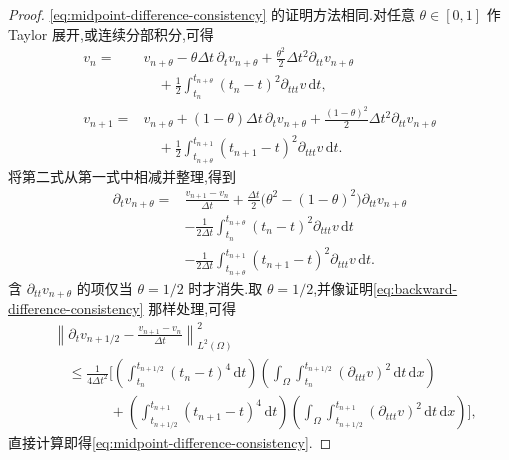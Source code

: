 \begin{proof}
\cref{eq:midpoint-difference-consistency} 的证明方法相同.对任意 $\theta\in[0,1]$ 作 Taylor 展开,或连续分部积分,可得
\[
\begin{aligned}
 v_n={}&v_{n+\theta}-\theta\Delta t\,\partial_t v_{n+\theta}
       +\frac{\theta^2}{2}\Delta t^2\partial_{tt}v_{n+\theta}\\
      &\quad+\frac12\int_{t_n}^{t_{n+\theta}}
          (t_n-t)^2\partial_{ttt}v\,\mathrm{d}t,\\
 v_{n+1}={}&v_{n+\theta}+(1-\theta)\Delta t\,\partial_t v_{n+\theta}
       +\frac{(1-\theta)^2}{2}\Delta t^2\partial_{tt}v_{n+\theta}\\
      &\quad+\frac12\int_{t_{n+\theta}}^{t_{n+1}}
          (t_{n+1}-t)^2\partial_{ttt}v\,\mathrm{d}t.
\end{aligned}
\]
将第二式从第一式中相减并整理,得到
\[
\begin{aligned}
 \partial_t v_{n+\theta}
   ={}&\frac{v_{n+1}-v_n}{\Delta t}
      +\frac{\Delta t}{2}\bigl(\theta^2-(1-\theta)^2\bigr)
          \partial_{tt}v_{n+\theta}\\
     &-\frac1{2\Delta t}\int_{t_n}^{t_{n+\theta}}
          (t_n-t)^2\partial_{ttt}v\,\mathrm{d}t
      \\[-1mm]
     &-\frac1{2\Delta t}\int_{t_{n+\theta}}^{t_{n+1}}
          (t_{n+1}-t)^2\partial_{ttt}v\,\mathrm{d}t.
\end{aligned}
\]
含 $\partial_{tt}v_{n+\theta}$ 的项仅当 $\theta=1/2$ 时才消失.取 $\theta=1/2$,并像证明\cref{eq:backward-difference-consistency} 那样处理,可得
\[
\begin{aligned}
 &\left\|\partial_t v_{n+1/2}
       -\frac{v_{n+1}-v_n}{\Delta t}\right\|_{L^2(\Omega)}^2\\
 &\quad\le\frac1{4\Delta t^2}\Biggl[
   \left(\int_{t_n}^{t_{n+1/2}}(t_n-t)^4\,\mathrm{d}t\right)
   \left(\int_\Omega\int_{t_n}^{t_{n+1/2}}
       (\partial_{ttt}v)^2\,\mathrm{d}t\,\mathrm{d}x\right)\\
 &\qquad\qquad+
   \left(\int_{t_{n+1/2}}^{t_{n+1}}(t_{n+1}-t)^4\,\mathrm{d}t\right)
   \left(\int_\Omega\int_{t_{n+1/2}}^{t_{n+1}}
       (\partial_{ttt}v)^2\,\mathrm{d}t\,\mathrm{d}x\right)
   \Biggr],
\end{aligned}
\]
直接计算即得\cref{eq:midpoint-difference-consistency}.
\end{proof}

